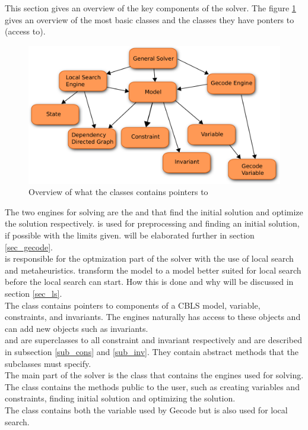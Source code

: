 This section gives an overview of the key components of the solver. The figure \ref{fig_architec} gives an overview 
of the most basic classes and the classes they have ponters to (access to). \\
\begin{figure}[!b]
\includegraphics[width=\linewidth]{architectureTest}\caption{Overview of what the classes contains pointers to} 
\label{fig_architec}
\end{figure}
The two engines for solving are the \gecodesol and \lssol that find the initial solution and optimize the solution 
respectively. \gecodesol is used for preprocessing and finding an initial solution, if possible with the limits given. 
\gecodesol will be elaborated further in section \ref{sec_gecode}. \\
\lssol is responsible for the optmization part of the solver with the use of local search and metaheuristics. \lssol 
transform the model to a model better suited for local search before the local search can start. How this is done and 
why will be discussed in section \ref{sec_ls}. \\ 
The  class contains pointers to components of a CBLS model, variable, constraints, and invariants. The 
engines naturally has access to these objects and \lssol can add new objects such as invariants. \\ 
 and  are superclasses to all constraint and invariant respectively and are 
described in subsection \ref{sub_cons} and \ref{sub_inv}. They contain abstract methods that the subclasses must 
specify. \\ 
The main part of the solver is the  class that contains the engines used for solving.
The  class contains the methods public to the user, such as creating variables and constraints, 
finding initial solution and optimizing the solution. \\ 
The  class contains both the variable used by Gecode but is also used for local search. 
